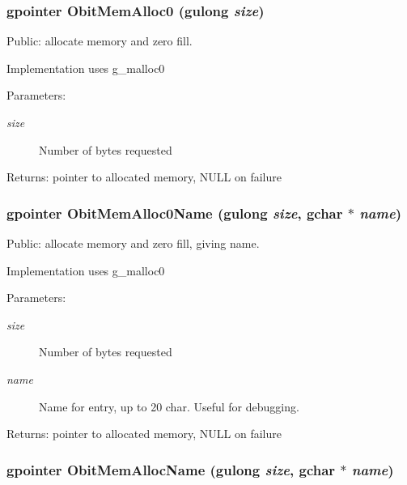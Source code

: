 \subsubsection{\setlength{\rightskip}{0pt plus 5cm}gpointer Obit\-Mem\-Alloc0 (gulong {\em size})}\label{ObitMem_8c_a11}


Public: allocate memory and zero fill. 

Implementation uses g\_\-malloc0 \begin{Desc}
\item[Parameters:]
\begin{description}
\item[{\em size}]Number of bytes requested \end{description}
\end{Desc}
\begin{Desc}
\item[Returns:]pointer to allocated memory, NULL on failure \end{Desc}
\subsubsection{\setlength{\rightskip}{0pt plus 5cm}gpointer Obit\-Mem\-Alloc0Name (gulong {\em size}, gchar $\ast$ {\em name})}\label{ObitMem_8c_a13}


Public: allocate memory and zero fill, giving name. 

Implementation uses g\_\-malloc0 \begin{Desc}
\item[Parameters:]
\begin{description}
\item[{\em size}]Number of bytes requested \item[{\em name}]Name for entry, up to 20 char. Useful for debugging. \end{description}
\end{Desc}
\begin{Desc}
\item[Returns:]pointer to allocated memory, NULL on failure \end{Desc}
\subsubsection{\setlength{\rightskip}{0pt plus 5cm}gpointer Obit\-Mem\-Alloc\-Name (gulong {\em size}, gchar $\ast$ {\em name})}\label{ObitMem_8c_a12}


